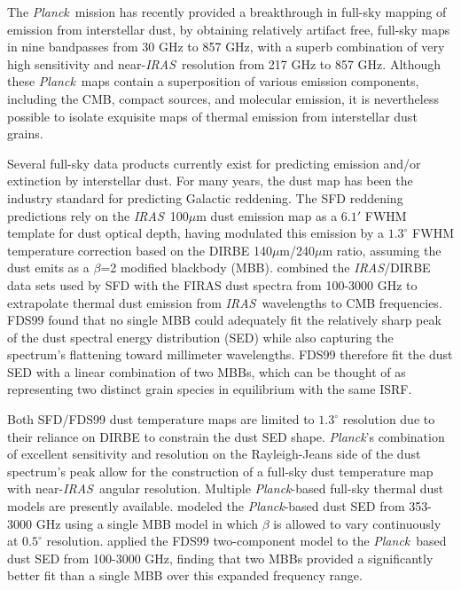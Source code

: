 \documentclass{emulateapj}
\newcommand{\IRAS}{{\it IRAS}}
\newcommand{\PLANCK}{{\it Planck}}
\begin{document}
The \PLANCK~mission \citep{planck2013,planck2015} has recently provided a 
breakthrough in full-sky mapping of emission from interstellar dust, by 
obtaining relatively artifact free, full-sky maps in nine bandpasses from 30 
GHz to 857 GHz, with a superb combination of very high sensitivity and 
near-\IRAS~resolution from 217 GHz to 857 GHz. Although these \PLANCK~maps 
contain a superposition of various emission components, including the CMB, 
compact sources, and molecular emission, it is nevertheless possible to isolate
exquisite maps of thermal emission from interstellar dust grains.

Several full-sky data products currently exist for predicting emission and/or
extinction by interstellar dust. For many years, the 
\citet[hereafter SFD]{SFD} dust map has been the industry standard for 
predicting Galactic reddening. The SFD reddening predictions rely on the
\IRAS~100$\mu$m dust emission map as a $6.1'$ FWHM template for dust optical 
depth, having modulated this emission by a $1.3^{\circ}$ FWHM temperature 
correction based on the DIRBE 140$\mu$m/240$\mu$m ratio, assuming the dust
emits as a $\beta$=2 modified blackbody (MBB). \citet[henceforth FDS99]{FDS99} 
combined the \IRAS/DIRBE data sets used by SFD with the FIRAS \citep{firas} 
dust spectra from 100-3000 GHz to extrapolate thermal dust emission from 
\IRAS~wavelengths to CMB frequencies. FDS99 found that no single MBB could
adequately fit the relatively sharp peak of the dust spectral energy 
distribution (SED) while also capturing the spectrum's flattening toward
millimeter wavelengths. FDS99 therefore fit the dust SED with a linear 
combination of two MBBs, which can be thought of as representing two 
distinct grain species in equilibrium with the same ISRF.

Both SFD/FDS99 dust temperature maps are limited to $1.3^{\circ}$ resolution 
due to their reliance on DIRBE to constrain the dust SED shape. \PLANCK's 
combination of excellent sensitivity and resolution on the Rayleigh-Jeans
side of the dust spectrum's peak allow for the construction of a full-sky dust 
temperature map with near-\IRAS~angular resolution. Multiple \PLANCK-based 
full-sky thermal dust models are presently available. \cite{planckdust} modeled
the \PLANCK-based dust SED from 353-3000 GHz using a single MBB model in which
$\beta$ is allowed to vary continuously at $0.5^{\circ}$ resolution. 
\cite{meisner15} applied the FDS99 two-component model to the \PLANCK~based
dust SED from 100-3000 GHz, finding that two MBBs provided a significantly
better fit than a single MBB over this expanded frequency range.
\end{document}
